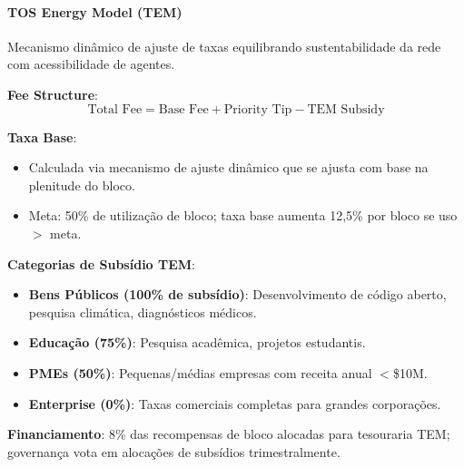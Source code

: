 \documentclass[11pt]{article}
\begin{document}
\begin{itemize}[noitemsep]
\begin{itemize}[noitemsep]
\begin{itemize}[noitemsep]
\paragraph{TOS Energy Model (TEM)}
Mecanismo dinâmico de ajuste de taxas equilibrando sustentabilidade da rede com acessibilidade de agentes.

\textbf{Fee Structure}:
\begin{equation}
\text{Total Fee} = \text{Base Fee} + \text{Priority Tip} - \text{TEM Subsidy}
\end{equation}

\textbf{Taxa Base}:
\begin{itemize}[noitemsep]
  \item Calculada via mecanismo de ajuste dinâmico que se ajusta com base na plenitude do bloco.
  \item Meta: 50\% de utilização de bloco; taxa base aumenta 12,5\% por bloco se uso $>$ meta.
\end{itemize}

\textbf{Categorias de Subsídio TEM}:
\begin{itemize}[noitemsep]
  \item \textbf{Bens Públicos (100\% de subsídio)}: Desenvolvimento de código aberto, pesquisa climática, diagnósticos médicos.
  \item \textbf{Educação (75\%)}: Pesquisa acadêmica, projetos estudantis.
  \item \textbf{PMEs (50\%)}: Pequenas/médias empresas com receita anual $<$\$10M.
  \item \textbf{Enterprise (0\%)}: Taxas comerciais completas para grandes corporações.
\end{itemize}

\textbf{Financiamento}: 8\% das recompensas de bloco alocadas para tesouraria TEM; governança vota em alocações de subsídios trimestralmente.


\end{itemize}
\end{itemize}
\end{itemize}
\end{document}
